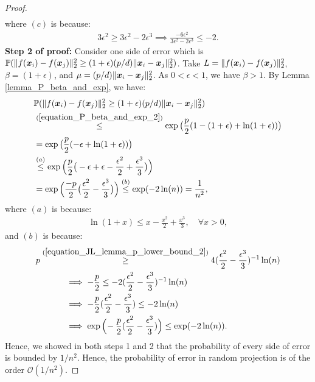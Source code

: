 \documentclass{article}
\def\b{\ensuremath\boldsymbol}
\begin{document}
\begin{proof}
\begin{align*}
\end{align*}
where $(c)$ is because:
\begin{align*}
3\epsilon^2 \geq 3\epsilon^2 - 2\epsilon^3 \implies \frac{-6 \epsilon^2}{3\epsilon^2 - 2\epsilon^3} \leq -2.
\end{align*}
\textbf{Step 2 of proof:}
Consider one side of error which is $\mathbb{P}(\|f(\b{x}_i) - f(\b{x}_j)\|_2^2 \geq (1+\epsilon) (p/d) \|\b{x}_i - \b{x}_j\|_2^2)$. Take $L = \|f(\b{x}_i) - f(\b{x}_j)\|_2^2$, $\beta = (1+\epsilon)$, and $\mu = (p/d) \|\b{x}_i - \b{x}_j\|_2^2$. As $0 < \epsilon < 1$, we have $\beta>1$. By Lemma \ref{lemma_P_beta_and_exp}, we have:
\begin{align}
&\mathbb{P}(\|f(\b{x}_i) - f(\b{x}_j)\|_2^2 \geq (1+\epsilon) (p/d) \|\b{x}_i - \b{x}_j\|_2^2) \nonumber\\
&\overset{(\ref{equation_P_beta_and_exp_2})}{\leq} \exp\big(\frac{p}{2} (1 - (1+\epsilon) + \ln (1+\epsilon))\big) \nonumber\\
&= \exp\big(\frac{p}{2} (-\epsilon + \ln (1+\epsilon))\big) \nonumber\\
&\overset{(a)}{\leq} \exp\Big(\frac{p}{2} \big(-\epsilon+\epsilon-\frac{\epsilon^2}{2} + \frac{\epsilon^3}{3} \big)\Big) \nonumber\\
&= \exp\Big(\frac{-p}{2} \big(\frac{\epsilon^2}{2} - \frac{\epsilon^3}{3} \big)\Big) \overset{(b)}{\leq} \exp(-2 \ln(n)) = \frac{1}{n^2},
\end{align}
where $(a)$ is because:
\begin{align*}
\ln(1+x) \leq x - \frac{x^2}{2} + \frac{x^3}{3}, \quad \forall x > 0,
\end{align*}
and $(b)$ is because:
\begin{align*}
&p \overset{(\ref{equation_JL_lemma_p_lower_bound_2})}{\geq} 4(\frac{\epsilon^2}{2} - \frac{\epsilon^3}{3})^{-1} \ln(n) \\
&~~~~~~~~~~ \implies -\frac{p}{2} \leq -2(\frac{\epsilon^2}{2} - \frac{\epsilon^3}{3})^{-1} \ln(n) \\
&~~~~~~~~~~ \implies -\frac{p}{2} (\frac{\epsilon^2}{2} - \frac{\epsilon^3}{3}) \leq -2 \ln(n) \\
&~~~~~~~~~~ \implies \exp\Big(\!-\frac{p}{2} (\frac{\epsilon^2}{2} - \frac{\epsilon^3}{3})\Big) \leq \exp(-2 \ln(n)).
\end{align*}
Hence, we showed in both steps 1 and 2 that the probability of every side of error is bounded by $1/n^2$. Hence, the probability of error in random projection is of the order $\mathcal{O}(1/n^2)$. 
\end{proof}
\end{document}
